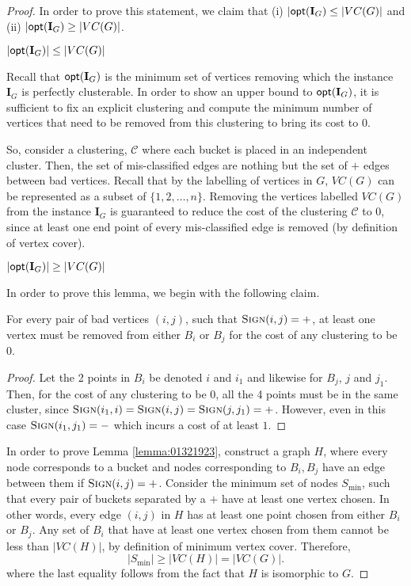\begin{proof}
In order to prove this statement, we claim that (i) $|\mathsf{opt} (\mathbf{I}_G) \le |VC(G)|$ and (ii) $|\mathsf{opt} (\mathbf{I}_G) \ge |VC(G)|$.
\begin{claim}
$|\mathsf{opt} (\mathbf{I}_G)| \le |VC(G)|$
\end{claim}
Recall that $\mathsf{opt} (\mathbf{I}_G)$ is the minimum set of vertices removing which the instance $\mathbf{I}_G$ is perfectly clusterable. In order to show an upper bound to $\mathsf{opt} (\mathbf{I}_G)$, it is sufficient to fix an explicit clustering and compute the minimum number of vertices that need to be removed from this clustering to bring its cost to $0$.

So, consider a clustering, $\mathcal{C}$ where each bucket is placed in an independent cluster. Then, the set of mis-classified edges are nothing but the set of $+$ edges between bad vertices. Recall that by the labelling of vertices in $G$, $VC(G)$ can be represented as a subset of $\{1,2,\dots,n\}$. Removing the vertices labelled $VC(G)$ from the instance $\mathbf{I}_G$ is guaranteed to reduce the cost of the clustering $\mathcal{C}$ to $0$, since at least one end point of every mis-classified edge is removed (by definition of vertex cover).

\begin{claim} \label{lemma:01321923}
$|\mathsf{opt} (\mathbf{I}_G)| \ge |VC(G)|$
\end{claim}
In order to prove this lemma, we begin with the following claim.

\begin{claim}
For every pair of bad vertices $(i,j)$, such that $\textsc{Sign} (i,j) = +$, at least one vertex must be removed from either $B_i$ or $B_j$ for the cost of any clustering to be $0$.    
\end{claim}
\begin{proof}
Let the 2 points in $B_i$ be denoted $i$ and $i_1$ and likewise for $B_j$, $j$ and $j_1$. Then, for the cost of any clustering to be $0$, all the 4 points must be in the same cluster, since $\textsc{Sign}(i_1,i) = \textsc{Sign} (i,j) = \textsc{Sign}(j,j_1) = +$. However, even in this case $\textsc{Sign}(i_1,j_1) = -$ which incurs a cost of at least $1$.
\end{proof}

In order to prove Lemma \ref{lemma:01321923}, construct a graph $H$, where every node corresponds to a bucket and nodes corresponding to $B_i,B_j$ have an edge between them if $\textsc{Sign} (i,j) = +$. Consider the minimum set of nodes $S_{\min}$, such that every pair of buckets separated by a $+$ have at least one vertex chosen. In other words, every edge $(i,j)$ in $H$ has at least one point chosen from either $B_i$ or $B_j$. Any set of $B_i$ that have at least one vertex chosen from them cannot be less than $|VC(H)|$, by definition of minimum vertex cover. Therefore,
\begin{equation*}
	|S_{\min}| \ge |VC(H)| = |VC(G)|.
\end{equation*}
where the last equality follows from the fact that $H$ is isomorphic to $G$.


\end{proof}
